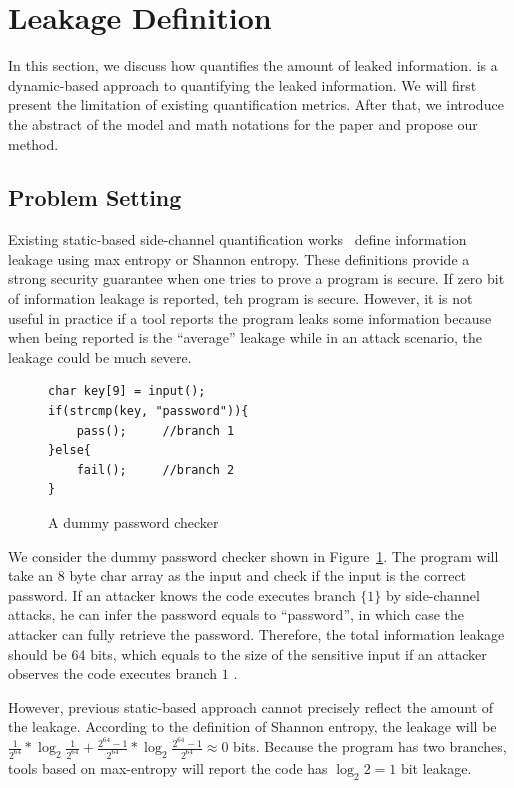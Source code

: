 \section{\tool{} Leakage Definition}
\label{sec:trace-qif}
In this section, we discuss how \tool{} quantifies the amount of leaked
information. \tool{} is a dynamic-based approach to quantifying the leaked
information. We will first present the limitation of existing quantification
metrics. After that, we introduce the abstract of the model and math notations
for the paper and propose our method.

\subsection{Problem Setting}
Existing static-based side-channel quantification
works~\cite{182946,Wichelmann:2018:MFF:3274694.3274741 } define information
leakage using max entropy or Shannon entropy. These definitions provide a strong
security guarantee when one tries to prove a program is secure.  If zero bit of
information leakage is reported, teh program is secure. However, it is not
useful in practice if a tool reports the program leaks some information because
when being reported is the ``average'' leakage while in an attack scenario, the
leakage could be much severe.


\begin{figure}[h!]
    \centering
    \begin{lstlisting}[xleftmargin=.03\textwidth,xrightmargin=.01\textwidth]
char key[9] = input();
if(strcmp(key, "password")){
    pass();     //branch 1
}else{
    fail();     //branch 2
}
\end{lstlisting}
    \caption{A dummy password checker}
    \label{fig:password-checker}
\end{figure}

We consider the dummy password checker shown in Figure~\ref{fig:password-checker}.
The program will take an 8 byte char array as the input and check if the
input is the correct password. If an attacker knows the code executes branch
$\{{1\}}$ by side-channel attacks, he can infer the password equals to ``password'', in
which case the attacker can fully retrieve the password. Therefore, the total
information leakage should be 64 bits, which equals to the size of the sensitive
input if an attacker observes the code executes branch $1$ .

However, previous static-based approach cannot precisely reflect the amount of
the leakage. According to the definition of Shannon entropy, the leakage will be
$\frac{1}{2^{64}}*\log_{2}\frac{1}{2^{64}} + \frac{2^{64}-1}{2^{64}} *\log_{2}\frac{2^{64}-1}{2^{64}} \approx
0$ bits. Because the program has two branches, tools based on max-entropy
will report the code has $\log_2{2} = 1$ bit leakage.

